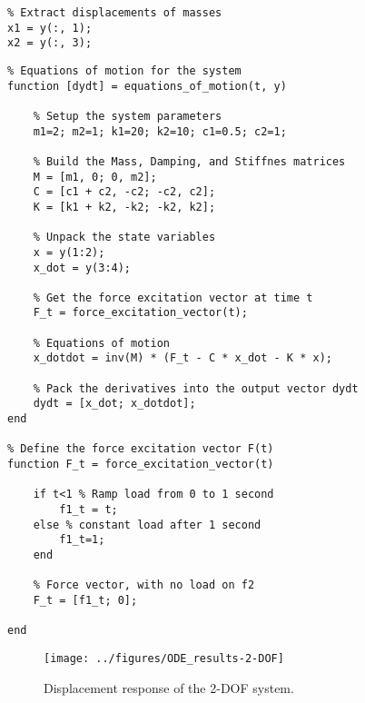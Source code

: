 \documentclass[12pt,letter]{article}
\begin{document}
\begin{example}
\begin{lstlisting}
% Extract displacements of masses
x1 = y(:, 1);
x2 = y(:, 3);
\end{lstlisting}
	
	
\begin{lstlisting}
% Equations of motion for the system
function [dydt] = equations_of_motion(t, y)

	% Setup the system parameters
	m1=2; m2=1; k1=20; k2=10; c1=0.5; c2=1;
	
	% Build the Mass, Damping, and Stiffnes matrices 
	M = [m1, 0; 0, m2];
	C = [c1 + c2, -c2; -c2, c2];
	K = [k1 + k2, -k2; -k2, k2];
	
	% Unpack the state variables
	x = y(1:2);
	x_dot = y(3:4);
	
	% Get the force excitation vector at time t
	F_t = force_excitation_vector(t);
	
	% Equations of motion
	x_dotdot = inv(M) * (F_t - C * x_dot - K * x);
	
	% Pack the derivatives into the output vector dydt
	dydt = [x_dot; x_dotdot];
end

% Define the force excitation vector F(t)
function F_t = force_excitation_vector(t)
	
	if t<1 % Ramp load from 0 to 1 second 
	    f1_t = t;
	else % constant load after 1 second 
	    f1_t=1;
	end
	
	% Force vector, with no load on f2
	F_t = [f1_t; 0]; 

end
\end{lstlisting}
	
	
\begin{figure}[H]
	\centering
	\texttt{[image: ../figures/ODE\_results-2-DOF]}
	\caption{Displacement response of the 2-DOF system.}
	\label{fig:ODE_results-2-DOF}
\end{figure}
				
	\end{example}
				
\end{document}

